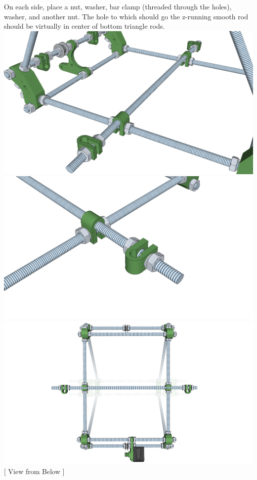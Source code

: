 \documentclass[twoside,a4paper,titlepage]{memoir}
\begin{document}
	\section{}
	On each side, place a nut, washer, bar clamp (threaded through the holes), washer, and another nut.
	The hole to which should go the z-running smooth rod should be virtually in center of bottom triangle
	rods.\\
	\includegraphics[width=1\linewidth]{graphics/ch5_6_1.png}
	\includegraphics[width=1\linewidth]{graphics/ch5_6_2.png}
	\includegraphics[width=1\linewidth]{graphics/ch5_6_3.png}
	[ View from Below ]
	
\end{document}
